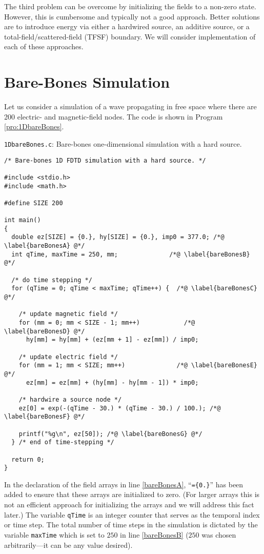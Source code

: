 The third problem can be overcome by initializing the fields to a
non-zero state.  However, this is cumbersome and typically not a good
approach.  Better solutions are to introduce energy via either a
hardwired source, an additive source, or a total-field/scattered-field
(TFSF) boundary.  We will consider implementation of each of these
approaches.

\section{Bare-Bones Simulation \label{sec:bareBones}}

Let us consider a simulation of a wave propagating in free space where 
there are 200 electric- and magnetic-field nodes.  The code is shown
in Program \ref{pro:1DbareBones}.
\begin{program}
{\tt 1DbareBones.c}: 
Bare-bones one-dimensional simulation with a hard
source. \label{pro:1DbareBones}
\codemiddle
\begin{lstlisting}
/* Bare-bones 1D FDTD simulation with a hard source. */

#include <stdio.h>
#include <math.h>

#define SIZE 200

int main()
{
  double ez[SIZE] = {0.}, hy[SIZE] = {0.}, imp0 = 377.0; /*@ \label{bareBonesA} @*/
  int qTime, maxTime = 250, mm;              /*@ \label{bareBonesB} @*/

  /* do time stepping */
  for (qTime = 0; qTime < maxTime; qTime++) {  /*@ \label{bareBonesC} @*/

    /* update magnetic field */
    for (mm = 0; mm < SIZE - 1; mm++)            /*@ \label{bareBonesD} @*/
      hy[mm] = hy[mm] + (ez[mm + 1] - ez[mm]) / imp0;

    /* update electric field */
    for (mm = 1; mm < SIZE; mm++)              /*@ \label{bareBonesE} @*/
      ez[mm] = ez[mm] + (hy[mm] - hy[mm - 1]) * imp0;

    /* hardwire a source node */
    ez[0] = exp(-(qTime - 30.) * (qTime - 30.) / 100.); /*@ \label{bareBonesF} @*/

    printf("%g\n", ez[50]); /*@ \label{bareBonesG} @*/
  } /* end of time-stepping */

  return 0;
}
\end{lstlisting}
\end{program}
In the declaration of the field arrays in line \ref{bareBonesA},
``{\tt=\{0.\}}'' has been added to ensure that these arrays are
initialized to zero.  (For larger arrays this is not an efficient
approach for initializing the arrays and we will address this fact
later.)  The variable {\tt qTime} is an integer counter that serves as
the temporal index or time step.  The total number of time steps in
the simulation is dictated by the variable {\tt maxTime} which is set
to $250$ in line \ref{bareBonesB} ($250$ was chosen arbitrarily---it
can be any value desired).


